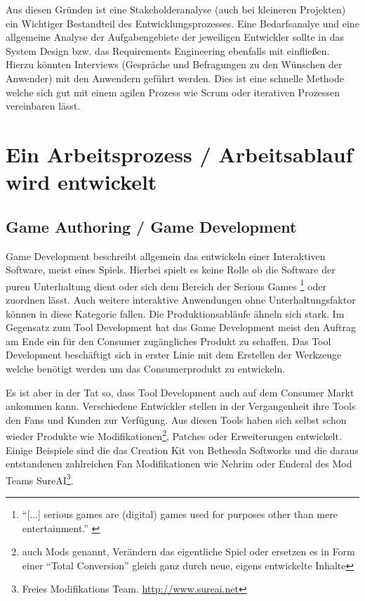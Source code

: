 \documentclass[pagesize, paper=a4, fontsize=12pt,titlepage=true, headings=small, headnosepline, abstractoff, liststotoc, nochapterprefix, plainheadsepline, twoside]{scrreprt}
\begin{document}
Aus diesen Gründen ist eine Stakeholderanalyse (auch bei kleineren Projekten) ein Wichtiger Bestandteil des Entwicklungsprozesses. Eine Bedarfsanalye und eine allgemeine Analyse der Aufgabengebiete der jeweiligen Entwickler sollte in das System Design bzw. das Requirements Engineering ebenfalls mit einfließen. Hierzu könnten Interviews (Gespräche und Befragungen zu den Wünschen der Anwender) mit den Anwendern geführt werden. Dies ist eine schnelle Methode welche sich gut mit einem agilen Prozess wie Scrum oder iterativen Prozessen vereinbaren lässt.

\section{Ein Arbeitsprozess / Arbeitsablauf wird entwickelt}
\subsection{Game Authoring / Game Development}
Game Development beschreibt allgemein das entwickeln einer Interaktiven Software, meist eines Spiels. Hierbei spielt es keine Rolle ob die Software der puren Unterhaltung dient oder sich dem Bereich der Serious Games \footnote{ “[...] serious games are (digital) games used for purposes other than mere entertainment.” \cite{Tarja2007}} oder zuordnen lässt. Auch weitere interaktive Anwendungen ohne Unterhaltungsfaktor können in diese Kategorie fallen. Die Produktionsabläufe ähneln sich stark. Im Gegensatz zum Tool Development hat das Game Development meist den Auftrag am Ende ein für den Consumer zugängliches Produkt zu schaffen. Das Tool Development beschäftigt sich in erster Linie mit dem Erstellen der Werkzeuge welche benötigt werden um das Consumerprodukt zu entwickeln.

Es ist aber in der Tat so, dass Tool Development auch auf dem Consumer Markt ankommen kann. Verschiedene Entwickler stellen in der Vergangenheit ihre Tools den Fans und Kunden zur Verfügung. Aus diesen Tools haben sich selbst schon wieder Produkte wie Modifikationen\footnote{auch Mods genannt, Verändern das eigentliche Spiel oder ersetzen es in Form einer “Total Conversion” gleich ganz durch neue, eigens entwickelte Inhalte}, Patches oder Erweiterungen entwickelt. Einige Beispiele sind die das Creation Kit von Bethesda Softworks und die daraus entstandenen zahlreichen Fan Modifikationen wie Nehrim oder Enderal des Mod Teams SureAI\footnote{Freies Modifikations Team. \url{http://www.sureai.net}}.

\end{document}
